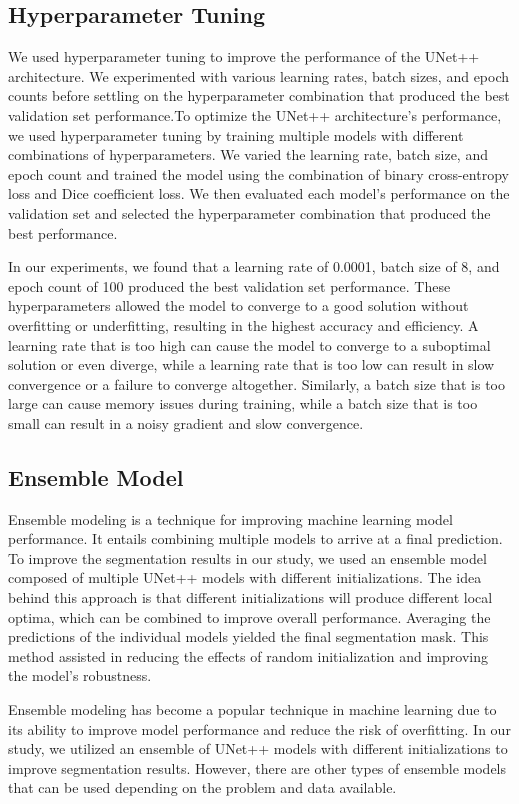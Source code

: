 \documentclass[conference]{IEEEtran}
\begin{document}
\subsection{Hyperparameter Tuning}\label{SCM}
We used hyperparameter tuning to improve the performance of the UNet++ architecture. We experimented with various learning rates, batch sizes, and epoch counts before settling on the hyperparameter combination that produced the best validation set performance.To optimize the UNet++ architecture's performance, we used hyperparameter tuning by training multiple models with different combinations of hyperparameters. We varied the learning rate, batch size, and epoch count and trained the model using the combination of binary cross-entropy loss and Dice coefficient loss. We then evaluated each model's performance on the validation set and selected the hyperparameter combination that produced the best performance.

In our experiments, we found that a learning rate of 0.0001, batch size of 8, and epoch count of 100 produced the best validation set performance. These hyperparameters allowed the model to converge to a good solution without overfitting or underfitting, resulting in the highest accuracy and efficiency. A learning rate that is too high can cause the model to converge to a suboptimal solution or even diverge, while a learning rate that is too low can result in slow convergence or a failure to converge altogether. Similarly, a batch size that is too large can cause memory issues during training, while a batch size that is too small can result in a noisy gradient and slow convergence.

\subsection{Ensemble Model}\label{SCM}
Ensemble modeling is a technique for improving machine learning model performance. It entails combining multiple models to arrive at a final prediction. To improve the segmentation results in our study, we used an ensemble model composed of multiple UNet++ models with different initializations. The idea behind this approach is that different initializations will produce different local optima, which can be combined to improve overall performance. Averaging the predictions of the individual models yielded the final segmentation mask. This method assisted in reducing the effects of random initialization and improving the model's robustness.

Ensemble modeling has become a popular technique in machine learning due to its ability to improve model performance and reduce the risk of overfitting. In our study, we utilized an ensemble of UNet++ models with different initializations to improve segmentation results. However, there are other types of ensemble models that can be used depending on the problem and data available.
\end{document}
